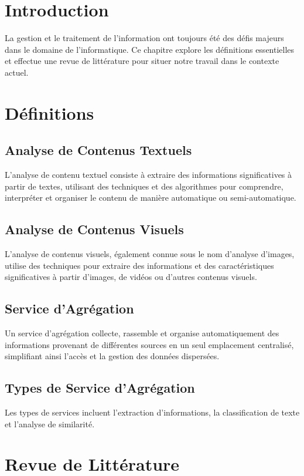 \documentclass{article}
\begin{document}
	\section{Introduction}
	La gestion et le traitement de l'information ont toujours été des défis majeurs dans le domaine de l'informatique. Ce chapitre explore les définitions essentielles et effectue une revue de littérature pour situer notre travail dans le contexte actuel.
	
	\section{Définitions}
	
	\subsection{Analyse de Contenus Textuels}
	L'analyse de contenu textuel consiste à extraire des informations significatives à partir de textes, utilisant des techniques et des algorithmes pour comprendre, interpréter et organiser le contenu de manière automatique ou semi-automatique.
	
	\subsection{Analyse de Contenus Visuels}
	L'analyse de contenus visuels, également connue sous le nom d'analyse d'images, utilise des techniques pour extraire des informations et des caractéristiques significatives à partir d'images, de vidéos ou d'autres contenus visuels.
	
	\subsection{Service d'Agrégation}
	Un service d'agrégation collecte, rassemble et organise automatiquement des informations provenant de différentes sources en un seul emplacement centralisé, simplifiant ainsi l'accès et la gestion des données dispersées.
	
	\subsection{Types de Service d'Agrégation}
	Les types de services incluent l'extraction d'informations, la classification de texte et l'analyse de similarité.
	
	\section{Revue de Littérature}
	
\end{document}
